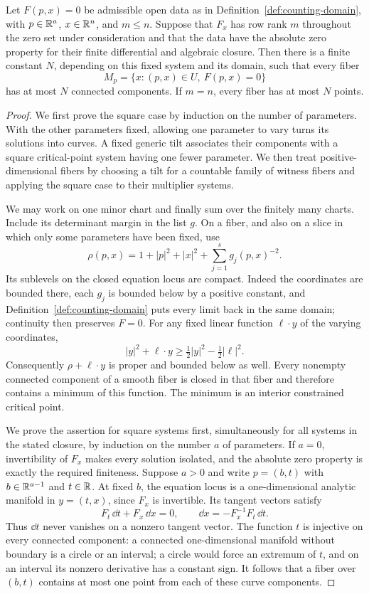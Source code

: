 \begin{theorem}\label{thm:projection-count}
Let $F(p,x)=0$ be admissible open data as in
Definition~\ref{def:counting-domain}, with
$p\in\mathbb{R}^a$, $x\in\mathbb{R}^n$, and $m\le n$.  Suppose that $F_x$ has
row rank $m$ throughout the zero set under consideration and that the
data have the absolute zero property for their finite differential and
algebraic closure.  Then there is a finite constant $N$, depending on
this fixed system and its domain, such that every fiber
\[
 M_p=\{x:(p,x)\in U,\ F(p,x)=0\}
\]
has at most $N$ connected components.  If $m=n$, every fiber has at most
$N$ points.
\end{theorem}

\begin{proof}
We first prove the square case by induction on the number of parameters.
With the other parameters fixed, allowing one parameter to vary turns
its solutions into curves.  A fixed generic tilt associates their
components with a square critical-point system having one fewer
parameter.  We then treat positive-dimensional fibers by choosing a
tilt for a countable family of witness fibers and applying the square
case to their multiplier systems.

We may work on one minor chart and finally sum over the finitely many
charts.  Include its determinant margin in the list $g$.  On a fiber,
and also on a slice in which only some parameters have been fixed, use
\begin{equation}\label{eq:counting-barrier}
 \rho(p,x)=1+|p|^2+|x|^2+\sum_{j=1}^s g_j(p,x)^{-2}.
\end{equation}
Its sublevels on the closed equation locus are compact.  Indeed the
coordinates are bounded there, each $g_j$ is bounded below by a
positive constant, and Definition~\ref{def:counting-domain} puts every
limit back in the same domain; continuity then preserves $F=0$.
For any fixed linear function $\ell\cdot y$ of the varying coordinates,
\[
 |y|^2+\ell\cdot y\ge \tfrac12|y|^2-\tfrac12|\ell|^2.
\]
Consequently $\rho+\ell\cdot y$ is proper and bounded below as well.
Every nonempty connected component of a smooth fiber is closed in that
fiber and therefore contains a minimum of this function.  The minimum
is an interior constrained critical point.

We prove the assertion for square systems first, simultaneously for
all systems in the stated closure, by induction on the number $a$ of
parameters.  If $a=0$, invertibility of $F_x$ makes every solution
isolated, and the absolute zero property is exactly the required
finiteness.  Suppose $a>0$ and write $p=(b,t)$ with
$b\in\mathbb{R}^{a-1}$ and $t\in\mathbb{R}$.  At fixed $b$, the equation locus is
a one-dimensional analytic manifold in $y=(t,x)$, since $F_x$ is
invertible.  Its tangent vectors satisfy
\[
 F_t\,\dd t+F_x\,\dd x=0,
 \qquad \dd x=-F_x^{-1}F_t\,\dd t.
\]
Thus $\dd t$ never vanishes on a nonzero tangent vector.  The function
$t$ is injective on every connected component: a connected
one-dimensional manifold without boundary is a circle or an interval;
a circle would force an extremum of $t$, and on an interval its
nonzero derivative has a constant sign.  It follows that a fiber over
$(b,t)$ contains at most one point from each of these curve components.


\end{proof}

